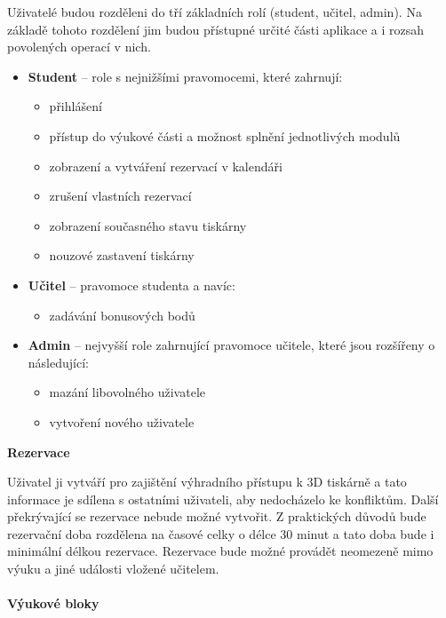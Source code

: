 \documentclass[twoside, 12pt]{article}
\begin{document}
Uživatelé budou rozděleni do tří základních rolí (student, učitel, admin). Na základě tohoto rozdělení jim budou přístupné určité části aplikace a i rozsah povolených operací v nich.
\clearpage
\begin{itemize}
    \item \textbf{Student} -- role s nejnižšími pravomocemi, které zahrnují:
\begin{itemize}
    \item přihlášení
    \item přístup do výukové části a možnost splnění jednotlivých modulů
    \item zobrazení a vytváření rezervací v kalendáři
    \item zrušení vlastních rezervací
    \item zobrazení současného stavu tiskárny
    \item nouzové zastavení tiskárny
\end{itemize}
\item \textbf{Učitel} -- pravomoce studenta a navíc:
\begin{itemize}
    \item zadávání bonusových bodů
\end{itemize}
\item \textbf{Admin} -- nejvyšší role zahrnující pravomoce učitele, které jsou rozšířeny o následující:
\begin{itemize}
    \item mazání libovolného uživatele
    \item vytvoření nového uživatele
\end{itemize}
\end{itemize}

\noindent\textbf{Rezervace}

Uživatel ji vytváří pro zajištění výhradního přístupu k 3D tiskárně a tato informace je sdílena s ostatními uživateli, aby nedocházelo ke konfliktům. Další překrývající se rezervace nebude možné vytvořit. Z praktických důvodů bude rezervační doba rozdělena na časové celky o délce 30 minut a tato doba bude i minimální délkou rezervace. Rezervace bude možné provádět neomezeně mimo výuku a jiné události vložené učitelem.
\\
\\
\textbf{Výukové bloky}
\end{document}
